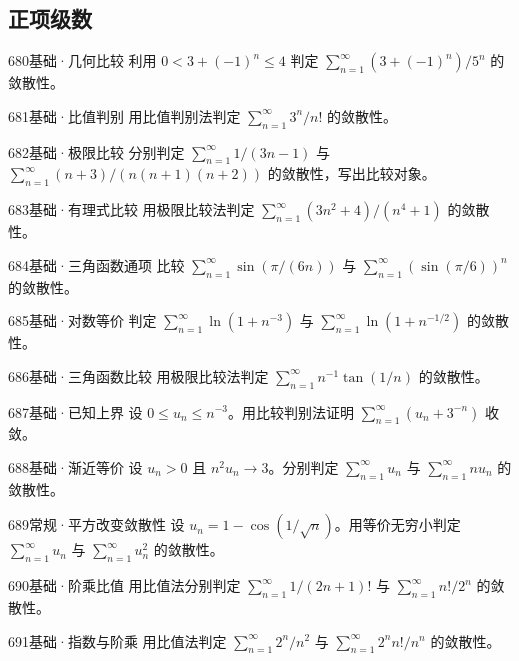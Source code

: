 \subsection{正项级数}
\begin{exercise}{680}{基础·几何比较}
利用 $0<3+(-1)^n\leq4$ 判定 $\sum_{n=1}^{\infty}(3+(-1)^n)/5^n$ 的敛散性。
\end{exercise}
\begin{exercise}{681}{基础·比值判别}
用比值判别法判定 $\sum_{n=1}^{\infty}3^n/n!$ 的敛散性。
\end{exercise}
\begin{exercise}{682}{基础·极限比较}
分别判定 $\sum_{n=1}^{\infty}1/(3n-1)$ 与 $\sum_{n=1}^{\infty}(n+3)/(n(n+1)(n+2))$ 的敛散性，写出比较对象。
\end{exercise}
\begin{exercise}{683}{基础·有理式比较}
用极限比较法判定 $\sum_{n=1}^{\infty}(3n^2+4)/(n^4+1)$ 的敛散性。
\end{exercise}
\begin{exercise}{684}{基础·三角函数通项}
比较 $\sum_{n=1}^{\infty}\sin(\pi/(6n))$ 与 $\sum_{n=1}^{\infty}(\sin(\pi/6))^n$ 的敛散性。
\end{exercise}
\begin{exercise}{685}{基础·对数等价}
判定 $\sum_{n=1}^{\infty}\ln(1+n^{-3})$ 与 $\sum_{n=1}^{\infty}\ln(1+n^{-1/2})$ 的敛散性。
\end{exercise}
\begin{exercise}{686}{基础·三角函数比较}
用极限比较法判定 $\sum_{n=1}^{\infty}n^{-1}\tan(1/n)$ 的敛散性。
\end{exercise}
\begin{exercise}{687}{基础·已知上界}
设 $0\leq u_n\leq n^{-3}$。用比较判别法证明 $\sum_{n=1}^{\infty}(u_n+3^{-n})$ 收敛。
\end{exercise}
\begin{exercise}{688}{基础·渐近等价}
设 $u_n>0$ 且 $n^2u_n\to3$。分别判定 $\sum_{n=1}^{\infty}u_n$ 与 $\sum_{n=1}^{\infty}nu_n$ 的敛散性。
\end{exercise}
\begin{exercise}{689}{常规·平方改变敛散性}
设 $u_n=1-\cos(1/\sqrt n)$。用等价无穷小判定 $\sum_{n=1}^{\infty}u_n$ 与 $\sum_{n=1}^{\infty}u_n^2$ 的敛散性。
\end{exercise}
\begin{exercise}{690}{基础·阶乘比值}
用比值法分别判定 $\sum_{n=1}^{\infty}1/(2n+1)!$ 与 $\sum_{n=1}^{\infty}n!/2^n$ 的敛散性。
\end{exercise}
\begin{exercise}{691}{基础·指数与阶乘}
用比值法判定 $\sum_{n=1}^{\infty}2^n/n^2$ 与 $\sum_{n=1}^{\infty}2^nn!/n^n$ 的敛散性。
\end{exercise}

